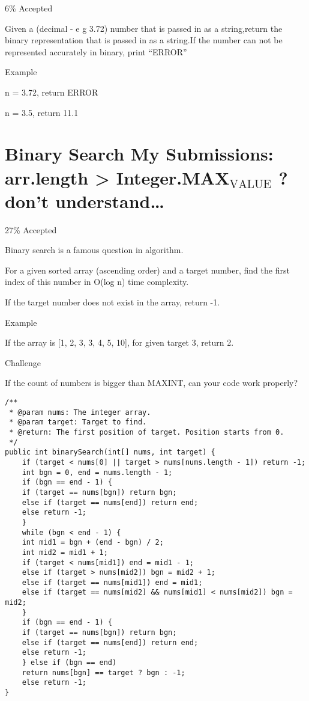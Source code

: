 \documentclass[12pt]{book}
\begin{document}
6\% Accepted

Given a (decimal - e g  3.72) number that is passed in as a string,return the binary representation that is passed in as a string.If the number can not be represented accurately in binary, print “ERROR”

Example

n = 3.72, return ERROR

n = 3.5, return 11.1
\chapter{Binary Search My Submissions: arr.length > Integer.MAX$_{\text{VALUE}}$ ? don't understand\ldots{}}
\label{sec-13}

27\% Accepted

Binary search is a famous question in algorithm.

For a given sorted array (ascending order) and a target number, find the first index of this number in O(log n) time complexity.

If the target number does not exist in the array, return -1.

Example

If the array is [1, 2, 3, 3, 4, 5, 10], for given target 3, return 2.

Challenge

If the count of numbers is bigger than MAXINT, can your code work
properly?

\lstset{language=java,label= ,caption= ,numbers=none}
\begin{lstlisting}
/**
 * @param nums: The integer array.
 * @param target: Target to find.
 * @return: The first position of target. Position starts from 0.
 */
public int binarySearch(int[] nums, int target) {
    if (target < nums[0] || target > nums[nums.length - 1]) return -1;
    int bgn = 0, end = nums.length - 1;
    if (bgn == end - 1) {
	if (target == nums[bgn]) return bgn;
	else if (target == nums[end]) return end;
	else return -1;
    }
    while (bgn < end - 1) {
	int mid1 = bgn + (end - bgn) / 2;
	int mid2 = mid1 + 1;
	if (target < nums[mid1]) end = mid1 - 1;
	else if (target > nums[mid2]) bgn = mid2 + 1;
	else if (target == nums[mid1]) end = mid1;
	else if (target == nums[mid2] && nums[mid1] < nums[mid2]) bgn = mid2;
    }
    if (bgn == end - 1) {
	if (target == nums[bgn]) return bgn;
	else if (target == nums[end]) return end;
	else return -1;
    } else if (bgn == end)
	return nums[bgn] == target ? bgn : -1;
    else return -1;
}
\end{lstlisting}
\end{document}
